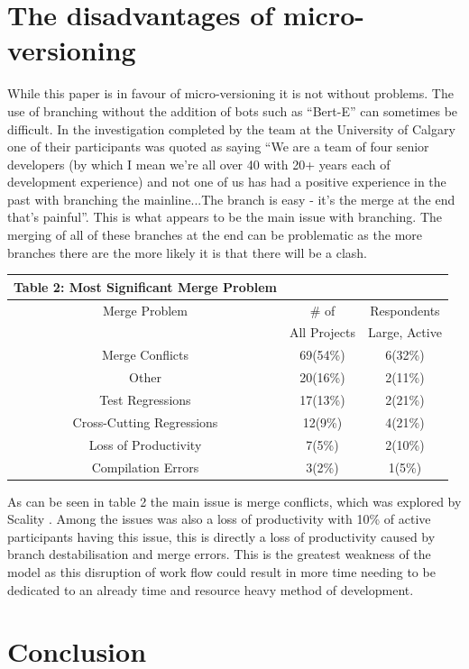 \documentclass{scrartcl}
\begin{document}
\section{The disadvantages of micro-versioning}
While this paper is in favour of micro-versioning it is not without problems. The use of branching without the addition of bots such as ``Bert-E'' can sometimes be difficult. In the investigation completed by the team at the University of Calgary one of their participants was quoted as saying ``We are a team of four senior developers (by
which I mean we’re all over 40 with 20+ years
each of development experience) and not one of
us has had a positive experience in the past with
branching the mainline...The branch is easy - it’s
the merge at the end that’s painful''\cite{phillips2011branching}. This is what appears to be the main issue with branching. The merging of all of these branches at the end can be problematic as the more branches there are the more likely it is that there will be a clash.
\begin{center}
	\begin{tabular}{c c c}
		\hline
		Table 2: Most Significant Merge Problem \cite{phillips2011branching} \\
		\hline
		Merge Problem & \# of & Respondents \\
		& All Projects & Large, Active \\
		\hline
		Merge Conflicts & 69(54\%) & 6(32\%) \\
		Other & 20(16\%) & 2(11\%) \\
		Test Regressions & 17(13\%) & 2(21\%)\\
		Cross-Cutting Regressions & 12(9\%) & 4(21\%) \\
		Loss of Productivity & 7(5\%) & 2(10\%) \\
		Compilation Errors & 3(2\%) & 1(5\%) \\
		\hline
	\end{tabular}
\end{center}
As can be seen in table 2 the main issue is merge conflicts, which was explored by Scality \cite{GitWaterFlow}. Among the issues was also a loss of productivity with 10\% of active participants having this issue, this is directly a loss of productivity caused by branch destabilisation and merge errors. This is the greatest weakness of the model as this disruption of work flow could result in more time needing to be dedicated to an already time and resource heavy method of development.
\section{Conclusion}
\end{document}
